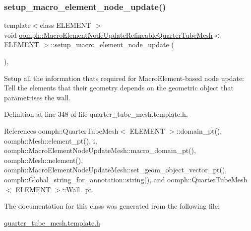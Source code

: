 \subsubsection{\texorpdfstring{setup\+\_\+macro\+\_\+element\+\_\+node\+\_\+update()}{setup\_macro\_element\_node\_update()}}
{\footnotesize\ttfamily template$<$class E\+L\+E\+M\+E\+NT $>$ \\
void \hyperlink{classoomph_1_1MacroElementNodeUpdateRefineableQuarterTubeMesh}{oomph\+::\+Macro\+Element\+Node\+Update\+Refineable\+Quarter\+Tube\+Mesh}$<$ E\+L\+E\+M\+E\+NT $>$\+::setup\+\_\+macro\+\_\+element\+\_\+node\+\_\+update (\begin{DoxyParamCaption}{ }\end{DoxyParamCaption})\hspace{0.3cm}{\ttfamily [inline]}, {\ttfamily [private]}}



Setup all the information that\textquotesingle{}s required for Macro\+Element-\/based node update\+: Tell the elements that their geometry depends on the geometric object that parametrises the wall. 



Definition at line 348 of file quarter\+\_\+tube\+\_\+mesh.\+template.\+h.



References oomph\+::\+Quarter\+Tube\+Mesh$<$ E\+L\+E\+M\+E\+N\+T $>$\+::domain\+\_\+pt(), oomph\+::\+Mesh\+::element\+\_\+pt(), i, oomph\+::\+Macro\+Element\+Node\+Update\+Mesh\+::macro\+\_\+domain\+\_\+pt(), oomph\+::\+Mesh\+::nelement(), oomph\+::\+Macro\+Element\+Node\+Update\+Mesh\+::set\+\_\+geom\+\_\+object\+\_\+vector\+\_\+pt(), oomph\+::\+Global\+\_\+string\+\_\+for\+\_\+annotation\+::string(), and oomph\+::\+Quarter\+Tube\+Mesh$<$ E\+L\+E\+M\+E\+N\+T $>$\+::\+Wall\+\_\+pt.



The documentation for this class was generated from the following file\+:\begin{DoxyCompactItemize}
\item 
\hyperlink{quarter__tube__mesh_8template_8h}{quarter\+\_\+tube\+\_\+mesh.\+template.\+h}\end{DoxyCompactItemize}
